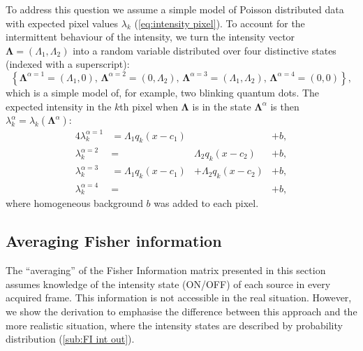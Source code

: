 To address this question we assume a simple model of Poisson distributed data with expected pixel values $\lambda_k$ (\autoref{eq:intensity pixel}). To account for the intermittent behaviour of the intensity, we turn the intensity vector $\bm{\Lambda}=(\Lambda_1,\Lambda_2)$ into a random variable distributed over four distinctive states (indexed with a superscript):
%
\begin{equation}
	\left\{ \bm{\Lambda}^{\alpha=1}=(\Lambda_1,0),\,\bm{\Lambda}^{\alpha=2}=(0,\Lambda_2),\,\bm{\Lambda}^{\alpha=3}=(\Lambda_1,\Lambda_2),\,\bm{\Lambda}^{\alpha=4}=(0,0)\right\},
	\label{eq:intensity states}
\end{equation}
%
which is a simple model of, for example, two blinking quantum dots. The expected intensity in the $k$th pixel when $\bm{\Lambda}$ is in the state $\bm{\Lambda}^\alpha$ is then $\lambda_k^\alpha=\lambda_k(\bm{\Lambda}^\alpha)$:
%
\begin{alignat}{4}
	\lambda_k^{\alpha=1}&=\Lambda_1q_k(x-c_1) & &+b,\nonumber\\ 
	\lambda_k^{\alpha=2}&=&\Lambda_2q_k(x-c_2) &+b,\nonumber\\ 
	\lambda_k^{\alpha=3}&=\Lambda_1q_k(x-c_1)&+\Lambda_2q_k(x-c_2)&+b,\nonumber\\ 
	\lambda_k^{\alpha=4}&=& &+b,
	\label{eq:lambda states}
\end{alignat}
%
where homogeneous background $b$ was added to each pixel.

\subsection{Averaging Fisher information\label{sub:avg FI}}

The ``averaging'' of the Fisher Information matrix presented in this section assumes knowledge of the intensity state (ON/OFF) of each source in every acquired frame. This information is not accessible in the real situation. However, we show the derivation to emphasise the difference between this approach and the more realistic situation, where the intensity states are described by probability distribution (\autoref{sub:FI int out}). 

